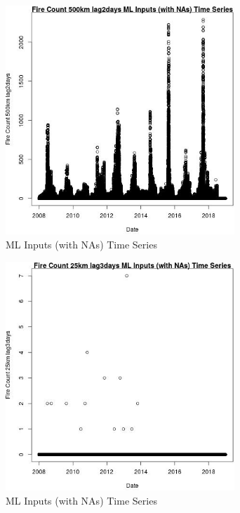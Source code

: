 \begin{figure} 
\centering  
\includegraphics[width=0.77\textwidth]{Code_Outputs/Report_ML_input_PM25_Step4_part_e_de_duplicated_aves_compiled_2019-05-21wNAs_Fire_Count_500km_lag2daysvDate.jpg} 
\caption{\label{fig:Report_ML_input_PM25_Step4_part_e_de_duplicated_aves_compiled_2019-05-21wNAsFire_Count_500km_lag2daysvDate}ML Inputs (with NAs) Time Series} 
\end{figure} 
 

\clearpage 

\begin{figure} 
\centering  
\includegraphics[width=0.77\textwidth]{Code_Outputs/Report_ML_input_PM25_Step4_part_e_de_duplicated_aves_compiled_2019-05-21wNAs_Fire_Count_25km_lag3daysvDate.jpg} 
\caption{\label{fig:Report_ML_input_PM25_Step4_part_e_de_duplicated_aves_compiled_2019-05-21wNAsFire_Count_25km_lag3daysvDate}ML Inputs (with NAs) Time Series} 
\end{figure} 
 

